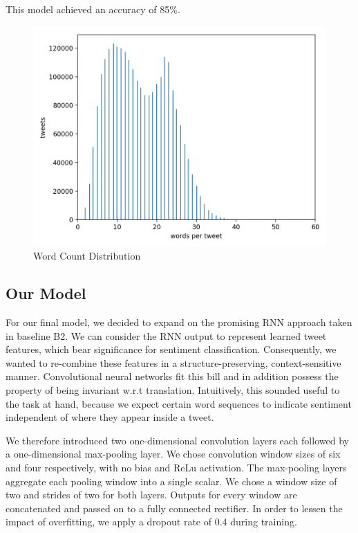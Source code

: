 \documentclass[10pt,conference,compsocconf]{IEEEtran}
\begin{document}
This model achieved an accuracy of 85\%.

\begin{figure}[h!]
  \centering
  \includegraphics[scale=0.53]{word_count_histogram.png}
  \caption{Word Count Distribution}
  \label{fig:wordcount}
\end{figure}


\subsection{Our Model}

For our final model, we decided to expand on the promising RNN
approach taken in baseline B2. We can consider the RNN output to
represent learned tweet features, which bear significance for
sentiment classification. Consequently, we wanted to re-combine these
features in a structure-preserving, context-sensitive
manner. Convolutional neural networks fit this bill and in addition
possess the property of being invariant w.r.t
translation. Intuitively, this sounded useful to the task at hand,
because we expect certain word sequences to indicate sentiment
independent of where they appear inside a tweet.

We therefore introduced two one-dimensional convolution layers each
followed by a one-dimensional max-pooling layer. We chose convolution
window sizes of six and four respectively, with no bias and ReLu
activation. The max-pooling layers aggregate each pooling window into
a single scalar. We chose a window size of two and strides of two for
both layers. Outputs for every window are concatenated and passed on
to a fully connected rectifier. In order to lessen the impact of
overfitting, we apply a dropout rate of 0.4 during training.
\end{document}
